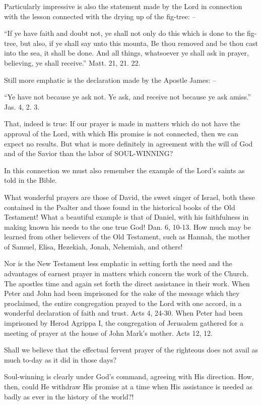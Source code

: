 \documentclass[
]{book}
\begin{document}
Particularly impressive is also the statement made by the Lord in connection with the lesson connected with the drying up of the fig-tree: --

``If ye have faith and doubt not, ye shall not only do this which is done to the fig-tree, but also, if ye shall say unto this mounta, Be thou removed and be thou cast into the sea, it shall be done. And all things, whatsoever ye shall ask in prayer, believing, ye shall receive.'' Matt. 21, 21. 22.

Still more emphatic is the declaration made by the Apostle James: --

``Ye have not because ye ask not. Ye ask, and receive not because ye ask amiss.'' Jas. 4, 2. 3.

That, indeed is true: If our prayer is made in matters which do not have the approval of the Lord, with which His promise is not connected, then we can expect no results. But what is more definitely in agreement with the will of God and of the Savior than the labor of SOUL-WINNING?

In this connection we must also remember the example of the Lord's saints as told in the Bible.

What wonderful prayers are those of David, the sweet singer of Israel, both these contained in the Psalter and those found in the historical books of the Old Testament! What a beautiful example is that of Daniel, with his faithfulness in making known his needs to the one true God! Dan. 6, 10-13. How much may be learned from other believers of the Old Testament, such as Hannah, the mother of Samuel, Elisa, Hezekiah, Jonah, Nehemiah, and others!

Nor is the New Testament less emphatic in setting forth the need and the advantages of earnest prayer in matters which concern the work of the Church. The apostles time and again set forth the direct assistance in their work. When Peter and John had been imprisoned for the sake of the message which they proclaimed, the entire congregation prayed to the Lord with one accord, in a wonderful declaration of faith and trust. Acts 4, 24-30. When Peter had been imprisoned by Herod Agrippa I, the congregation of Jerusalem gathered for a meeting of prayer at the house of John Mark's mother. Acts 12, 12.

Shall we believe that the effectual fervent prayer of the righteous does not avail as much to-day as it did in those days?

Soul-winning is clearly under God's command, agreeing with His direction. How, then, could He withdraw His promise at a time when His assistance is needed as badly as ever in the history of the world?!
\end{document}
